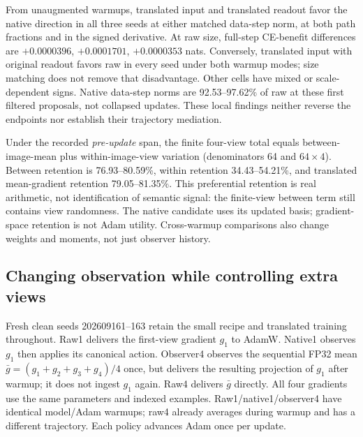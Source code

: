 \documentclass[10pt]{article}
\begin{document}
From unaugmented warmups, translated input and translated readout favor the native direction in all three seeds at either matched data-step norm, at both path fractions and in the signed derivative. At raw size, full-step CE-benefit differences are $+0.0000396$, $+0.0001701$, $+0.0000353$ nats. Conversely, translated input with original readout favors raw in every seed under both warmup modes; size matching does not remove that disadvantage. Other cells have mixed or scale-dependent signs. Native data-step norms are 92.53--97.62\% of raw at these first filtered proposals, not collapsed updates. These local findings neither reverse the endpoints nor establish their trajectory mediation.

Under the recorded \emph{pre-update} span, the finite four-view total equals between-image-mean plus within-image-view variation (denominators 64 and $64\times4$). Between retention is 76.93--80.59\%, within retention 34.43--54.21\%, and translated mean-gradient retention 79.05--81.35\%. This preferential retention is real arithmetic, not identification of semantic signal: the finite-view between term still contains view randomness. The native candidate uses its updated basis; gradient-space retention is not Adam utility. Cross-warmup comparisons also change weights and moments, not just observer history.

\subsection{Changing observation while controlling extra views}
Fresh clean seeds 202609161--163 retain the small recipe and translated training throughout. Raw1 delivers the first-view gradient $g_1$ to AdamW. Native1 observes $g_1$ then applies its canonical action. Observer4 observes the sequential FP32 mean $\bar g=(g_1+g_2+g_3+g_4)/4$ once, but delivers the resulting projection of $g_1$ after warmup; it does not ingest $g_1$ again. Raw4 delivers $\bar g$ directly. All four gradients use the same parameters and indexed examples. Raw1/native1/observer4 have identical model/Adam warmups; raw4 already averages during warmup and has a different trajectory. Each policy advances Adam once per update.
\end{document}
